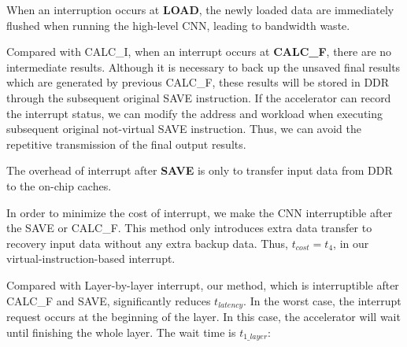 When an interruption occurs at \textbf{LOAD}, the newly loaded data are immediately flushed when running the high-level CNN, leading to bandwidth waste.

Compared with CALC\_I, when an interrupt occurs at \textbf{CALC\_F}, there are no intermediate results. 
Although it is necessary to back up the unsaved final results which are generated by previous CALC\_F, these results will be stored in DDR through the subsequent original SAVE instruction.
If the accelerator can record the interrupt status, we can modify the address and workload when executing subsequent original not-virtual SAVE instruction.
Thus, we can avoid the repetitive transmission of the final output results.

The overhead of interrupt after \textbf{SAVE} is only to transfer input data from DDR to the on-chip caches. 

In order to minimize the cost of interrupt, we make the CNN interruptible after the SAVE or CALC\_F. This method only introduces extra data transfer to recovery input data without any extra backup data. Thus, $t_{cost} = t_4$, in our virtual-instruction-based interrupt.


Compared with Layer-by-layer interrupt, our method, which is interruptible after CALC\_F and SAVE, significantly reduces $t_{latency}$.
In the worst case, the interrupt request occurs at the beginning of the layer. In this case, the accelerator will wait until finishing the whole layer. The wait time is $t_{1\_layer}$:

